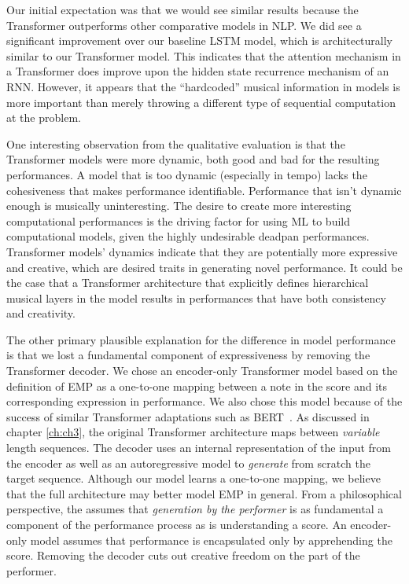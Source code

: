 Our initial expectation was that we would see similar results because the Transformer outperforms other comparative models in NLP. We did see a significant improvement over our baseline LSTM model, which is architecturally similar to our Transformer model. This indicates that the attention mechanism in a Transformer does improve upon the hidden state recurrence mechanism of an RNN. However, it appears that the ``hardcoded'' musical information in \vnet{} models is more important than merely throwing a different type of sequential computation at the problem.

One interesting observation from the qualitative evaluation is that the Transformer models were more dynamic, both good and bad for the resulting performances. A model that is too dynamic (especially in tempo) lacks the cohesiveness that makes performance identifiable. Performance that isn't dynamic enough is musically uninteresting. The desire to create more interesting computational performances is the driving factor for using ML to build computational models, given the highly undesirable deadpan performances. Transformer models' dynamics indicate that they are potentially more expressive and creative, which are desired traits in generating novel performance. It could be the case that a Transformer architecture that explicitly defines hierarchical musical layers in the model results in performances that have both consistency and creativity. 

The other primary plausible explanation for the difference in model performance is that we lost a fundamental component of expressiveness by removing the Transformer decoder. We chose an encoder-only Transformer model based on the \vnetf{} definition of EMP as a one-to-one mapping between a note in the score and its corresponding expression in performance. We also chose this model because of the success of similar Transformer adaptations such as BERT~\cite{devlin2018bert}. As discussed in chapter \ref{ch:ch3}, the original \ed{} Transformer architecture maps between \emph{variable} length sequences. The decoder uses an internal representation of the input from the encoder as well as an autoregressive model to \emph{generate} from scratch the target sequence. Although our model learns a one-to-one mapping, we believe that the full \ed{} architecture may better model EMP in general. From a philosophical perspective, the \ed{} assumes that \emph{generation by the performer} is as fundamental a component of the performance process as is understanding a score. An encoder-only model assumes that performance is encapsulated only by apprehending the score. Removing the decoder cuts out creative freedom on the part of the performer.

